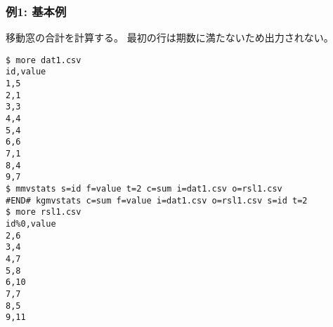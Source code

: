 \subsubsection*{例1: 基本例}

移動窓の合計を計算する。
最初の行は期数に満たないため出力されない。


\begin{Verbatim}[baselinestretch=0.7,frame=single]
$ more dat1.csv
id,value
1,5
2,1
3,3
4,4
5,4
6,6
7,1
8,4
9,7
$ mmvstats s=id f=value t=2 c=sum i=dat1.csv o=rsl1.csv
#END# kgmvstats c=sum f=value i=dat1.csv o=rsl1.csv s=id t=2
$ more rsl1.csv
id%0,value
2,6
3,4
4,7
5,8
6,10
7,7
8,5
9,11
\end{Verbatim}
